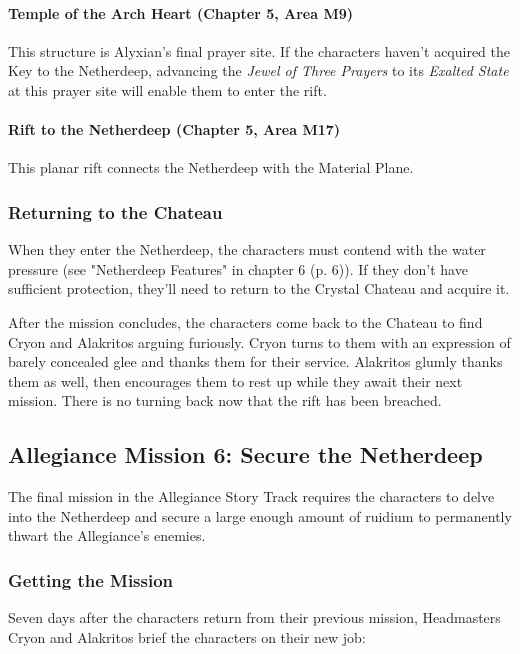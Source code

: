 \documentclass[a4paper, 11pt, bg=full, twocolumn, nooutline]{dndbook}
\begin{document}
\paragraph{Temple of the Arch Heart (Chapter 5, Area M9)}

This structure is Alyxian's final prayer site. If the characters haven't acquired the Key to the Netherdeep, advancing the \textit{Jewel of Three Prayers} to its \textit{Exalted State} at this prayer site will enable them to enter the rift.

\paragraph{Rift to the Netherdeep (Chapter 5, Area M17)}

This planar rift connects the Netherdeep with the Material Plane.

\subsubsection{Returning to the Chateau}

When they enter the Netherdeep, the characters must contend with the water pressure (see "Netherdeep Features" in chapter 6 (p. 6)). If they don't have sufficient protection, they'll need to return to the Crystal Chateau and acquire it.

After the mission concludes, the characters come back to the Chateau to find Cryon and Alakritos arguing furiously. Cryon turns to them with an expression of barely concealed glee and thanks them for their service. Alakritos glumly thanks them as well, then encourages them to rest up while they await their next mission. There is no turning back now that the rift has been breached.

\subsection{Allegiance Mission 6: Secure the Netherdeep}

The final mission in the Allegiance Story Track requires the characters to delve into the Netherdeep and secure a large enough amount of ruidium to permanently thwart the Allegiance's enemies.

\subsubsection{Getting the Mission}

Seven days after the characters return from their previous mission, Headmasters Cryon and Alakritos brief the characters on their new job:
\end{document}
